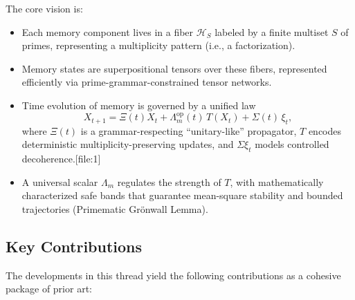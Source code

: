 \documentclass[11pt]{article}
\begin{document}
The core vision is:
\begin{itemize}[leftmargin=1.5em]
\item Each memory component lives in a fiber $\mathcal{H}_S$ labeled by a finite multiset $S$ of primes, representing a multiplicity pattern (i.e., a factorization).
\item Memory states are superpositional tensors over these fibers, represented efficiently via prime-grammar-constrained tensor networks.
\item Time evolution of memory is governed by a unified law
\[
X_{t+1} = \Xi(t) X_t + \Lambda_m^{\mathrm{op}}(t)\,T(X_t) + \Sigma(t)\,\xi_t,
\]
where $\Xi(t)$ is a grammar-respecting ``unitary-like'' propagator, $T$ encodes deterministic multiplicity-preserving updates, and $\Sigma\xi_t$ models controlled decoherence.[file:1]
\item A universal scalar $\Lambda_m$ regulates the strength of $T$, with mathematically characterized safe bands that guarantee mean-square stability and bounded trajectories (Primematic Grönwall Lemma).
\end{itemize}

\subsection{Key Contributions}

The developments in this thread yield the following contributions as a cohesive package of prior art:
\end{document}
